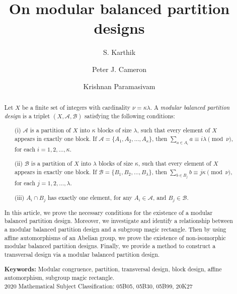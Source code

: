 \documentclass[preprint,11pt]{elsarticle}
\begin{document}
\begin{frontmatter}		
\title{On modular balanced partition designs}
\author[a]{S. Karthik}
\author[b]{Peter J. Cameron}
\author[a]{Krishnan Paramasivam}
\address[a]{Department of Mathematics, National Institute of Technology Calicut \\ Kozhikode~\textnormal{673601}, India. }
  		\address[b]{School of Mathematics and Statistics, University of St Andrews, St Andrews, Fife KY16
9SS, UK}

\begin{abstract}
Let $X$ be a finite set of integers with cardinality $\nu = \kappa \lambda$. A \emph{modular balanced partition design} is a triplet $(X, \mathcal{A}, \mathcal{B})$ satisfying the following conditions:
\begin{enumerate}
    \item[(i)] $\mathcal{A}$ is a partition of $X$ into $\kappa$ blocks of size $\lambda$, such that every element of $X$ appears in exactly one block. If $\mathcal{A} = \{A_1, A_2, \ldots, A_{\kappa}\}$, then
    $
        \sum_{a\in A_i} a \equiv i \lambda \pmod{\nu}$, for each $i=1,2,\ldots,\kappa.
    $
    \item[(ii)] $\mathcal{B}$ is a partition of $X$ into $\lambda$ blocks of size $\kappa$, such that every element of $X$ appears in exactly one block. If $\mathcal{B} = \{B_1, B_2, \ldots, B_{\lambda}\}$, then
    $\sum_{b\in B_j} b \equiv j \kappa \pmod{\nu}$, for each $j=1,2,\ldots,\lambda.
    $
    \item[(iii)] $A_i \cap B_j$ has exactly one element, for any $A_i \in \mathcal{A}$, and $B_j \in \mathcal{B}$.
\end{enumerate}

In this article, we prove the necessary conditions for the existence of a modular balanced partition design. Moreover, we investigate and identify a relationship between a modular balanced partition design and a subgroup magic rectangle. Then by using affine automorphisms of an Abelian group, we prove the existence of non-isomorphic modular balanced partition designs. Finally, we provide a method to construct a transversal design via a modular balanced partition design.
 
\noindent \textbf{Keywords:} Modular congruence, partition, transversal design, block design, affine automorphism, subgroup magic rectangle.\\
  {2020 Mathematical Subject Classification:   05B05, 05B30, 05B99, 20K27}
\end{abstract}
\end{frontmatter}
\end{document}
